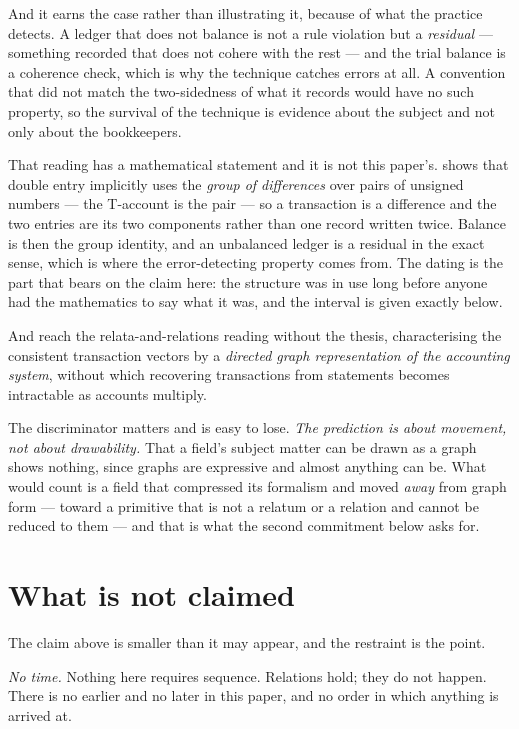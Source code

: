 \documentclass[11pt,a4paper]{article}
\begin{document}
And it earns the case rather than illustrating it, because of what the practice detects. A ledger that
does not balance is not a rule violation but a \emph{residual} --- something recorded that does not
cohere with the rest --- and the trial balance is a coherence check, which is why the technique catches
errors at all. A convention that did not match the two-sidedness of what it records would have no such
property, so the survival of the technique is evidence about the subject and not only about the
bookkeepers.

That reading has a mathematical statement and it is not this paper's.
\citet{ellerman1985,ellerman2014} shows that double entry implicitly uses the \emph{group of
differences} over pairs of unsigned numbers --- the T-account is the pair --- so a transaction is a
difference and the two entries are its two components rather than one record written twice. Balance is
then the group identity, and an unbalanced ledger is a residual in the exact sense, which is where the
error-detecting property comes from. The dating is the part that bears on the claim here: the structure was in use long before anyone had the mathematics to say what it was, and the interval is given exactly below.

And \citet{aryagraph2000} reach the relata-and-relations reading without the thesis, characterising
the consistent transaction vectors by a \emph{directed graph representation of the accounting system},
without which recovering transactions from statements \citep{arya2000} becomes intractable as accounts
multiply.

The discriminator matters and is easy to lose. \emph{The prediction is about movement, not about
drawability.} That a field's subject matter can be drawn as a graph shows nothing, since graphs are
expressive and almost anything can be. What would count is a field that compressed its formalism and
moved \emph{away} from graph form --- toward a primitive that is not a relatum or a relation and cannot
be reduced to them --- and that is what the second commitment below asks for.

\section{What is not claimed}\label{sec:not-claimed}
The claim above is smaller than it may appear, and the restraint is the point.

\emph{No time.} Nothing here requires sequence. Relations hold; they do not happen. There is no earlier
and no later in this paper, and no order in which anything is arrived at.
\end{document}
